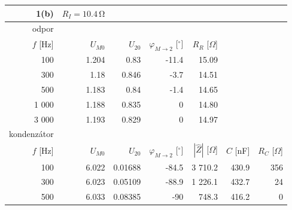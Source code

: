 \documentclass[czech,11pt,a4paper]{article}
\begin{document}
		\begin{center}
			{\footnotesize \begin{tabular}{rrrrrrr}
				\hline
				1(b)        & $R_{I}=10.4 \,\mathrm{\Omega}$ &          &                                      &                               &          &                  \\ \hline
				odpor       &                                &          &                                      &                               &          &                  \\
				$f$ [Hz]    & $U_{M0}$                       & $U_{20}$ & $\varphi_{M\rightarrow2}$ [$^\circ$] & $R_R$ [$\Omega$]              &          &                  \\
				100         & 1.204                          & 0.83     & -11.4                                & 15.09 &          &                  \\
				300         & 1.18                           & 0.846    & -3.7                                 & 14.51 &          &                  \\
				500         & 1.183                          & 0.84     & -1.4                                 & 14.65 &          &                  \\
				1 000        & 1.188                          & 0.835    & 0                                    & 14.80 &          &                  \\
				3 000        & 1.193                          & 0.829    & 0                                    & 14.97 &          &                  \\ \hline
				kondenzátor &                                &          &                                      &                               &          &                  \\
				$f$ [Hz]    & $U_{M0}$                       & $U_{20}$ & $\varphi_{M\rightarrow2}$ [$^\circ$] & $|\hat{Z}|$ [$\Omega$]        & $C$ [nF] & $R_C$ [$\Omega$] \\
				100         & 6.022                          & 0.01688  & -84.5                                & 3 710.2                       & 430.9     & 356 \\
				300         & 6.023                          & 0.05109  & -88.9                                & 1 226.1                       & 432.7      & 24 \\
				500         & 6.033                          & 0.08385  & -90                                  & 748.3                         & 416.2      & 0                \\

\end{tabular}}
\end{center}
\end{document}

